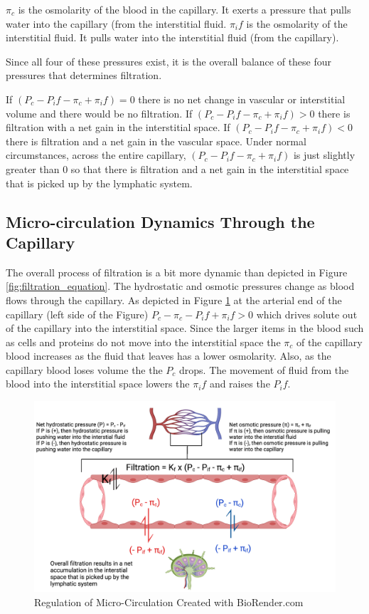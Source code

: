 $\pi_c$ is the osmolarity of the blood in the capillary. It exerts a pressure that pulls water into the capillary (from the interstitial fluid.  $\pi_if$ is the osmolarity of the interstitial fluid. It pulls water into the interstitial fluid (from the capillary). 

Since all four of these pressures exist, it is the overall balance of these four pressures that determines filtration. 

If $(P_c - P_if - \pi_c + \pi_if) = 0$ there is no net change in vascular or interstitial volume and there would be no filtration. If $(P_c - P_if - \pi_c + \pi_if) > 0$ there is filtration with a net gain in the interstitial space. If $(P_c - P_if - \pi_c + \pi_if) < 0$ there is filtration and a net gain in the vascular space. Under normal circumstances, across the entire capillary, $(P_c - P_if - \pi_c + \pi_if)$ is just slightly greater than 0 so that there is filtration and a net gain in the interstitial space that is picked up by the lymphatic system. 

\subsection{Micro-circulation Dynamics Through the Capillary}

The overall process of filtration is a bit more dynamic than depicted in Figure \ref{fig:filtration_equation}. The hydrostatic and osmotic pressures change as blood flows through the capillary. As depicted in Figure \ref{fig:Microcirculation_Regulation} at the arterial end of the capillary (left side of the Figure) $P_c - \pi_c - P_if + \pi_if > 0$ which drives solute out of the capillary into the interstitial space. Since the larger items in the blood such as cells and proteins do not move into the interstitial space the $\pi_c$ of the capillary blood increases as the fluid that leaves has a lower osmolarity. Also, as the capillary blood loses volume the the $P_c$ drops. The movement of fluid from the blood into the interstitial space lowers the $\pi_if$ and raises the $P_if$.

\begin{figure}[!h]
    \centering
    \includegraphics[width=1\linewidth]{./figure/Microcirculation_Regulation.png}
    \caption{Regulation of Micro-Circulation \footnotesize{Created with BioRender.com}}
    \label{fig:Microcirculation_Regulation}
\end{figure}

